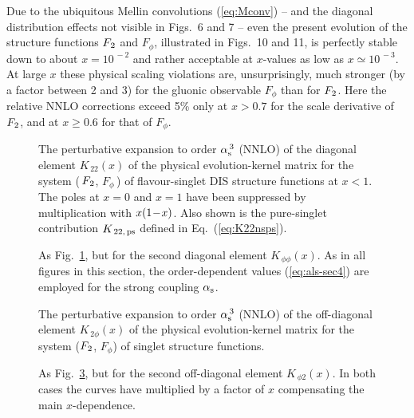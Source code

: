 \documentclass[12pt]{article}
\newcommand{\as}{\alpha_{\rm s}}
\begin{document}
Due to the ubiquitous Mellin convolutions (\ref{eq:Mconv}) -- and the diagonal
distribution effects not visible in Figs.~6 and 7 -- even the present
evolution of the structure functions ${F_{\:\! 2}}$ and $F_\phi$, illustrated in 
Figs.~10 and 11, is perfectly stable down to about $x = 10^{\,-2}$ and rather
acceptable at $x$-values as low as $x \simeq 10^{\,-3}$. At large $x$ these 
physical scaling violations are, unsurprisingly, much stronger (by a factor
between 2 and 3) for the gluonic observable $F_\phi$ than for ${F_{\:\! 2}}$. Here
the relative NNLO corrections exceed 5\% only at $x > 0.7$ for the scale
derivative of ${F_{\:\! 2}}$, and at $x \geq 0.6$ for that of $F_\phi$.

\begin{figure}[p]
\vspace*{-1mm}
\centerline{}
\vspace{-2mm}
\caption{\label{pic:fig6}
 The perturbative expansion to order $\as^{\,3}$ (NNLO) of the diagonal element
 $K_{\,22}(x)$ of the physical evolution-kernel matrix for the system 
 ($\,{F_{\:\! 2}}$, $F_\phi\,$) of flavour-singlet DIS structure functions at $x < 1$.
 The poles at $x=0$ and $x=1$ have been suppressed by multiplication with 
 $x \x1$. Also shown is the pure-singlet contribution $K_{\,22,\,\rm ps}$ 
 defined in Eq.~(\ref{eq:K22nsps}).
 }
\end{figure}
%
\begin{figure}[p]
\centerline{}
\vspace{-2mm}
\caption{\label{pic:fig7}
 As Fig.~\ref{pic:fig6}, but for the second diagonal element 
 $K_{\,\phi\phi}(x)$. As in all figures in this section, the order-dependent
 values (\ref{eq:als-sec4}) are employed for the strong coupling $\as$.
 }
\vspace{-1mm}
\end{figure}

\begin{figure}[p]
\vspace*{-1mm}
\centerline{}
\vspace{-2mm}
\caption{\label{pic:fig8}
 The perturbative expansion to order $\as^{\,3}$ (NNLO) of the off-diagonal
 element $K_{\,2\phi}(x)$ of the physical evolution-kernel matrix for the 
 system (${F_{\:\! 2}}$, $F_\phi$) of singlet structure functions. 
 }
\end{figure}
%
\begin{figure}[p]
\centerline{}
\vspace{-2mm}
\caption{\label{pic:fig9}
 As Fig.~\ref{pic:fig8}, but for the second off-diagonal element
 $K_{\,\phi 2}(x)$. In both cases the curves have multiplied by a factor of 
 $x$ compensating the main $x$-dependence.
 }
\vspace{-1mm}
\end{figure}
\end{document}
